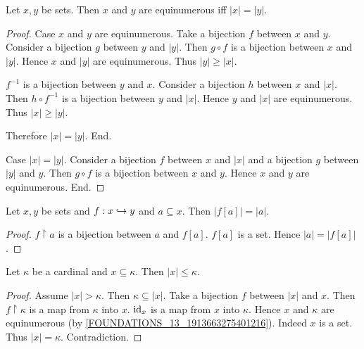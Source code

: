 \documentclass[../set-theory.tex]{subfiles}
\begin{document}
  \begin{forthel}
    \begin{proposition}
      Let $x, y$ be sets.
      Then $x$ and $y$ are equinumerous iff $|x| = |y|$.
    \end{proposition}
    \begin{proof}
      Case $x$ and $y$ are equinumerous.
        Take a bijection $f$ between $x$ and $y$.
        Consider a bijection $g$ between $y$ and $|y|$.
        Then $g \circ f$ is a bijection between $x$ and $|y|$.
        Hence $x$ and $|y|$ are equinumerous.
        Thus $|y| \geq |x|$.

        $f^{-1}$ is a bijection between $y$ and $x$.
        Consider a bijection $h$ between $x$ and $|x|$.
        Then $h \circ f^{-1}$ is a bijection between $y$ and $|x|$.
        Hence $y$ and $|x|$ are equinumerous.
        Thus $|x| \geq |y|$.

        Therefore $|x| = |y|$.
      End.

      Case $|x| = |y|$.
        Consider a bijection $f$ between $x$ and $|x|$ and a bijection $g$
        between $|y|$ and $y$.
        Then $g \circ f$ is a bijection between $x$ and $y$.
        Hence $x$ and $y$ are equinumerous.
      End.
    \end{proof}
  \end{forthel}

  \begin{forthel}
    \begin{proposition}
      Let $x, y$ be sets and $f : x \hookrightarrow y$ and $a \subseteq x$.
      Then $|f[a]| = |a|$.
    \end{proposition}
    \begin{proof}
      $f \restriction a$ is a bijection between $a$ and $f[a]$.
      $f[a]$ is a set.
      Hence $|a| = |f[a]|$.
    \end{proof}
  \end{forthel}

  \begin{forthel}
    \begin{proposition}
      Let $\kappa$ be a cardinal and $x \subseteq \kappa$.
      Then $|x| \leq \kappa$.
    \end{proposition}
    \begin{proof}
      Assume $|x| > \kappa$.
      Then $\kappa \subseteq |x|$.
      Take a bijection $f$ between $|x|$ and $x$.
      Then $f \restriction \kappa$ is a map from $\kappa$ into $x$.
      $\operatorname{id}_{x}$ is a map from $x$ into $\kappa$.
      Hence $x$ and $\kappa$ are equinumerous (by
      \cref{FOUNDATIONS_13_1913663275401216}).
      Indeed $x$ is a set.
      Thus $|x| = \kappa$.
      Contradiction.
    \end{proof}
  \end{forthel}
\end{document}
